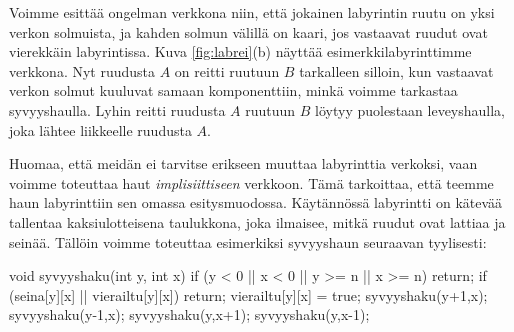 Voimme esittää ongelman verkkona niin,
että jokainen labyrintin ruutu on yksi verkon solmuista,
ja kahden solmun välillä on kaari,
jos vastaavat ruudut ovat vierekkäin labyrintissa.
Kuva \ref{fig:labrei}(b) näyttää esimerkkilabyrinttimme verkkona.
Nyt ruudusta $A$ on reitti ruutuun $B$ tarkalleen silloin,
kun vastaavat verkon solmut kuuluvat samaan komponenttiin,
minkä voimme tarkastaa syvyyshaulla.
Lyhin reitti ruudusta $A$ ruutuun $B$ löytyy puolestaan leveyshaulla,
joka lähtee liikkeelle ruudusta $A$.

Huomaa, että meidän ei tarvitse erikseen muuttaa labyrinttia
verkoksi, vaan voimme toteuttaa haut \emph{implisiittiseen} verkkoon.
Tämä tarkoittaa, että teemme haun labyrinttiin sen omassa
esitysmuodossa. Käytännössä labyrintti on kätevää tallentaa kaksiulotteisena
taulukkona, joka ilmaisee, mitkä ruudut ovat lattiaa ja seinää.
Tällöin voimme toteuttaa esimerkiksi syvyyshaun seuraavan tyylisesti:

\begin{code}
void syvyyshaku(int y, int x) {
    if (y < 0 || x < 0 || y >= n || x >= n) return;
    if (seina[y][x] || vierailtu[y][x]) return;
    vierailtu[y][x] = true;
    syvyyshaku(y+1,x);
    syvyyshaku(y-1,x);
    syvyyshaku(y,x+1);
    syvyyshaku(y,x-1);
}
\end{code}